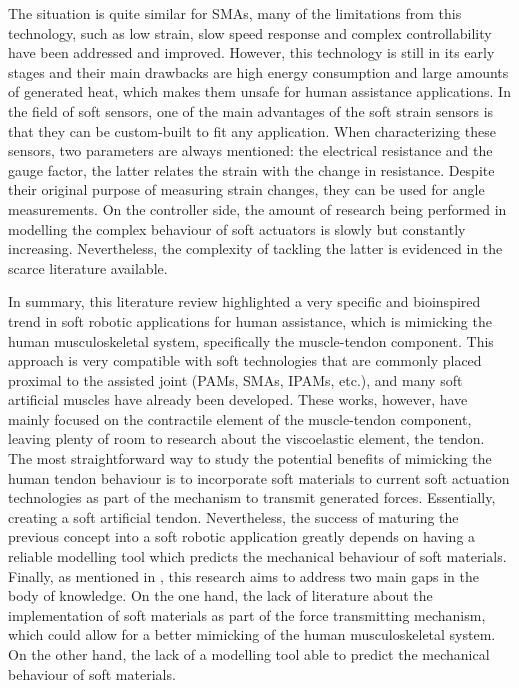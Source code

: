 The situation is quite similar for SMAs, many of the limitations from this technology, such as low strain, slow speed response and complex controllability have been addressed and improved. However, this technology is still in its early stages and their main drawbacks are high energy consumption and large amounts of generated heat, which makes them unsafe for human assistance applications. In the field of soft sensors, one of the main advantages of the soft strain sensors is that they can be custom-built to fit any application. When characterizing these sensors, two parameters are always mentioned: the electrical resistance and the gauge factor, the latter relates the strain with the change in resistance. Despite their original purpose of measuring strain changes, they can be used for angle measurements. On the controller side, the amount of research being performed in modelling the complex behaviour of soft actuators is slowly but constantly increasing. Nevertheless, the complexity of tackling the latter is evidenced in the scarce literature available.

In summary, this literature review highlighted a very specific and bioinspired trend in soft robotic applications for human assistance, which is mimicking the human musculoskeletal system, specifically the muscle-tendon component. This approach is very compatible with soft technologies that are commonly placed proximal to the assisted joint (PAMs, SMAs, IPAMs, etc.), and many soft artificial muscles have already been developed. These works, however, have mainly focused on the contractile element of the muscle-tendon component, leaving plenty of room to research about the viscoelastic element, the tendon. The most straightforward way to study the potential benefits of mimicking the human tendon behaviour is to incorporate soft materials to current soft actuation technologies as part of the mechanism to transmit generated forces. Essentially, creating a soft artificial tendon. Nevertheless, the success of maturing the previous concept into a soft robotic application greatly depends on having a reliable modelling tool which predicts the mechanical behaviour of soft materials. Finally, as mentioned in , this research aims to address two main gaps in the body of knowledge. On the one hand, the lack of literature about the implementation of soft materials as part of the force transmitting mechanism, which could allow for a better mimicking of the human musculoskeletal system. On the other hand, the lack of a modelling tool able to predict the mechanical behaviour of soft materials.
